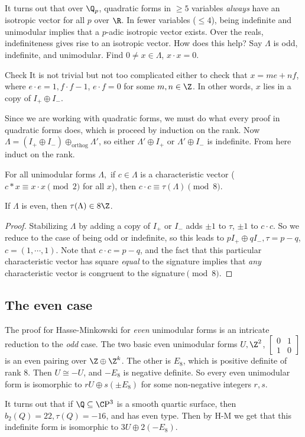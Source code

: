 It turns out that over $\Q_p$, quadratic forms in $\geq 5$ variables \emph{always} have an isotropic vector for all $p$ over $\R$. In fewer variables ($\leq 4$), being indefinite and unimodular implies that a $p$-adic isotropic vector exists. Over the reals, indefiniteness gives rise to an isotropic vector.
How does this help? Say $\Lambda$ is odd, indefinite, and unimodular. Find $0\neq x \in \Lambda$, $x\cdot x=0$.
\begin{namedthing}{Check} 
   It is not trivial but not too complicated either to check that $x=me+nf$, where $e\cdot e=1, f\cdot f-1$, $e \cdot f=0$ for some $m,n \in \Z$. In other words, $x$ lies in a copy of $I_+\oplus I_-$.
\end{namedthing}
Since we are working with quadratic forms, we must do what every proof in quadratic forms does, which is proceed by induction on the rank. Now $\Lambda=(I_+ \oplus I_-) \oplus _{\text{orthog} }\Lambda'$, so either $\Lambda'\oplus I_+$ or $\Lambda' \oplus I_-$ is indefinite. From here induct on the rank.

\begin{cor}
    For all unimodular forms $\Lambda ,$ if $c \in \Lambda$ is a characteristic vector ($c *x \equiv x \cdot x \pmod 2$ for all $x$), then $c \cdot  c \equiv \tau(\Lambda) \pmod 8$.
\end{cor}
\begin{example}
    If $\Lambda$ is even, then $\tau(\Lambda) \in  8 \Z$. 
\end{example}
\begin{proof}
    Stabilizing $\Lambda$ by adding a copy of $I_+$ or $I_-$ adds  $\pm 1$ to $\tau$, $\pm 1$ to $c \cdot c$. So we reduce to the case of being odd or indefinite, so this leads to $pI_+ \oplus qI_-,\tau = p-q$, $c=(1,\cdots ,1)$. Note that $ c \cdot  c =p-q$, and the fact that this particular characteristic vector has square \emph{equal} to the signature implies that \emph{any} characteristic vector is congruent to the signature$\pmod 8$.
\end{proof}
\subsection{The even case}
The proof for Hasse-Minkowski for \emph{even} unimodular forms is an intricate reduction to the \emph{odd} case. The two basic even unimodular forms $U,\Z^2$, $\left[ \begin{smallmatrix}
    0 & 1 \\ 1 & 0
\end{smallmatrix}\right] $ is an even pairing over $\Z \oplus \Z^k$. The other is $\boxed{E_8}$, which is positive definite of rank 8. Then $U \cong -U$, and $-E_8$ is negative definite. So every even unimodular form is isomorphic to $rU \oplus s(\pm E_8)$ for some non-negative integers $r,s$.
\begin{example}
    It turns out that if $\Q \subseteq \C \mathrm{P^3}$ is a smooth quartic surface, then $b_2(Q)=22, \tau(Q)=-16$, and has even type. Then by H-M we get that this indefinite form is isomorphic to $3U \oplus 2(-E_8)$.
\end{example}
